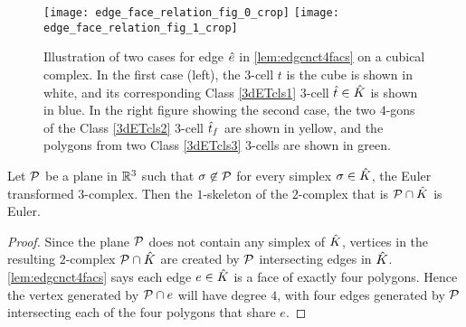 \begin{figure}[htp!]
  \centering
  \texttt{[image: edge\_face\_relation\_fig\_0\_crop]}
  \quad
  \texttt{[image: edge\_face\_relation\_fig\_1\_crop]}
  \caption{\label{fig:3dETedgefacerelation}
    Illustration of two cases for edge $\hat{e}$ in \cref{lem:edgcnct4facs} on a cubical complex.
    In the first case (left), the $3$-cell $t$ is the cube is shown in white, and its corresponding Class \ref{3dETcls1} $3$-cell $\hat{t} \in \hat{K}$ is shown in blue.
    In the right figure showing the second case, the two $4$-gons of the Class \ref{3dETcls2} $3$-cell $\hat{t}_{f}$ are shown in yellow, and the polygons from two Class \ref{3dETcls3} $3$-cells are shown in green.\\
    }
\end{figure}
\begin{prop} \label{rem:2DsliceEuler}
  Let $\mathcal{P}$ be a plane in ${\mathbb R}^3$ such that $\sigma \not\in \mathcal{P}$ for every simplex $\sigma \in \hat{K}$, the Euler transformed $3$-complex.
  Then the $1$-skeleton of the $2$-complex that is $\mathcal{P} \cap \hat{K}$ is Euler.
\end{prop}
\begin{proof}
  Since the plane $\mathcal{P}$ does not contain any simplex of $\hat{K}$, vertices in the resulting $2$-complex $\mathcal{P} \cap \hat{K}$ are created by $\mathcal{P}$ intersecting edges in $\hat{K}$.
  \cref{lem:edgcnct4facs} says each edge $e \in \hat{K}$ is a face of exactly four polygons.
  Hence the vertex generated by $\mathcal{P} \cap e$ will have degree $4$, with four edges generated by $\mathcal{P}$ intersecting each of the four polygons that share $e$.
\end{proof}

